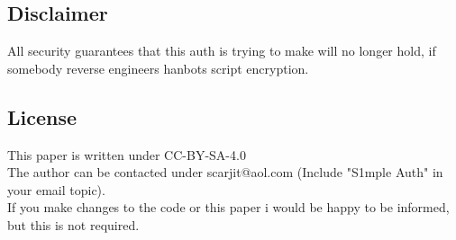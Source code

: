 \documentclass{article}
\begin{document}
\subsection{Disclaimer}
All security guarantees that this auth is trying to make will no longer hold, if somebody reverse engineers hanbots script encryption.

\subsection{License}
This paper is written under CC-BY-SA-4.0\\
The author can be contacted under scarjit@aol.com (Include "S1mple Auth" in your email topic).\\
If you make changes to the code or this paper i would be happy to be informed, but this is not required.
\end{document}
